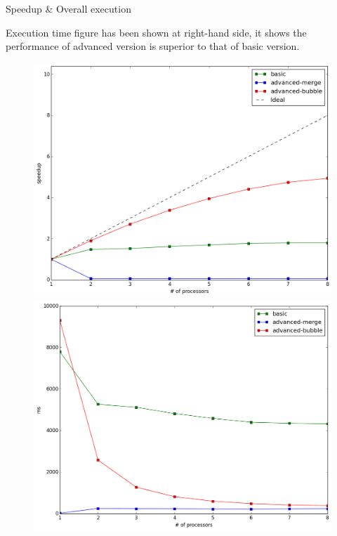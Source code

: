 \documentclass[12pt]{article}
\makeatletter
\renewenvironment{itemize}
{\list{$\bullet$}{\leftmargin\z@ \labelwidth\z@ \itemindent-\leftmargin
\let\makelabel\descriptionlabel}}
{\endlist}
\makeatother
\begin{document}
\begin{itemize}
	\newpage

	\item Speedup \& Overall execution
	\begin{flushleft}
		Execution time figure has been shown at right-hand side, it shows the performance of advanced version is superior to that of basic version.
	\end{flushleft}
	\begin{figure}[ht]
		\begin{minipage}{.49\textwidth}
			\hspace{-4.5em}
			\includegraphics[scale=.4]{../run_report/speedup.png}
		\end{minipage}
		\hspace{3em}
		\begin{minipage}{.49\textwidth}
			\hspace{-3em}
			\includegraphics[scale=.4]{../run_report/overall_exec.png}
		\end{minipage}
	\end{figure}


\end{itemize}
\end{document}
